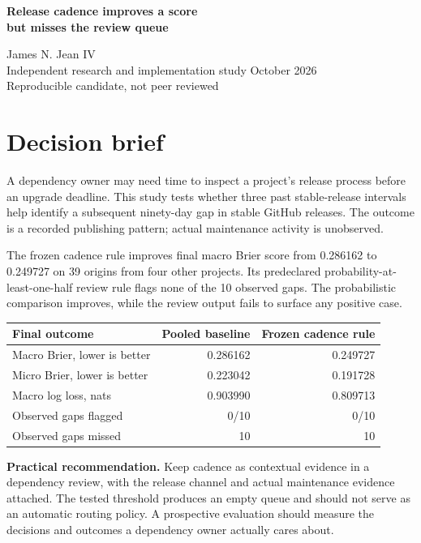 \documentclass[11pt]{article}
\newcommand{\MFinal}{39}
\newcommand{\MFinalPos}{10}
\newcommand{\MTP}{0}
\newcommand{\MFN}{10}
\newcommand{\MBaseFinal}{0.286162}
\newcommand{\MSelectedFinal}{0.249727}
\newcommand{\MBaseMicro}{0.223042}
\newcommand{\MSelectedMicro}{0.191728}
\newcommand{\MBaseLog}{0.903990}
\newcommand{\MSelectedLog}{0.809713}
\begin{document}
\begin{center}
{\LARGE\bfseries Release cadence improves a score\\but misses the review queue}\par
\vspace{8pt}James N. Jean IV\\
Independent research and implementation study October 2026\\
{\small Reproducible candidate, not peer reviewed}
\end{center}
\section*{Decision brief}
A dependency owner may need time to inspect a project's release process before an upgrade deadline. This study tests whether three past stable-release intervals help identify a subsequent ninety-day gap in stable GitHub releases. The outcome is a recorded publishing pattern; actual maintenance activity is unobserved.

The frozen cadence rule improves final macro Brier score from \MBaseFinal{} to \MSelectedFinal{} on \MFinal{} origins from four other projects. Its predeclared probability-at-least-one-half review rule flags none of the \MFinalPos{} observed gaps. The probabilistic comparison improves, while the review output fails to surface any positive case.

\begin{center}\begin{tabular}{lrr}\toprule
Final outcome & Pooled baseline & Frozen cadence rule\\\midrule
Macro Brier, lower is better & \MBaseFinal & \MSelectedFinal\\
Micro Brier, lower is better & \MBaseMicro & \MSelectedMicro\\
Macro log loss, nats & \MBaseLog & \MSelectedLog\\
Observed gaps flagged & 0/\MFinalPos & \MTP/\MFinalPos\\
Observed gaps missed & \MFinalPos & \MFN\\\bottomrule
\end{tabular}\end{center}

\textbf{Practical recommendation.} Keep cadence as contextual evidence in a dependency review, with the release channel and actual maintenance evidence attached. The tested threshold produces an empty queue and should not serve as an automatic routing policy. A prospective evaluation should measure the decisions and outcomes a dependency owner actually cares about.
\end{document}
